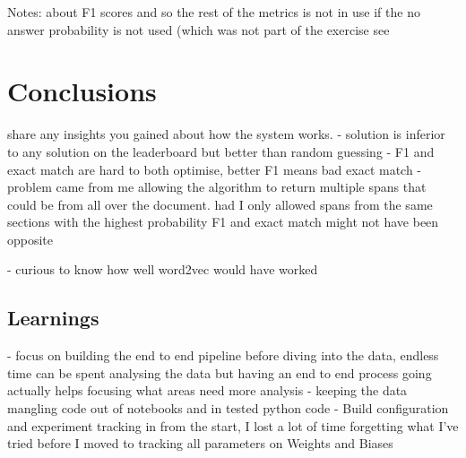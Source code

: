\documentclass[11pt]{article}
\begin{document}
    Notes: about F1 scores and so the rest of the metrics is not in use if the no answer probability is not used (which was not part of the exercise
    see \cite{squad2git}


    \section{Conclusions}\label{sec:conclusions}
    share any insights you gained about how the system works.
    - solution is inferior to any solution on the leaderboard but better than random guessing
    - F1 and exact match are hard to both optimise, better F1 means bad exact match
    -   problem came from me allowing the algorithm to return multiple spans that could be from all over the document.
    had I only allowed spans from the same sections with the highest probability F1 and exact match might not have been opposite

    - curious to know how well word2vec would have worked

    \subsection{Learnings}\label{subsec:learnings}
    - focus on building the end to end pipeline before diving into the data, endless time can be spent analysing the data
    but having an end to end process going actually helps focusing what areas need more analysis
    - keeping the data mangling code out of notebooks and in tested python code
    - Build configuration and experiment tracking in from the start, I lost a lot of time forgetting what I've tried before I
    moved to tracking all parameters on Weights and Biases


    
    
\end{document}
